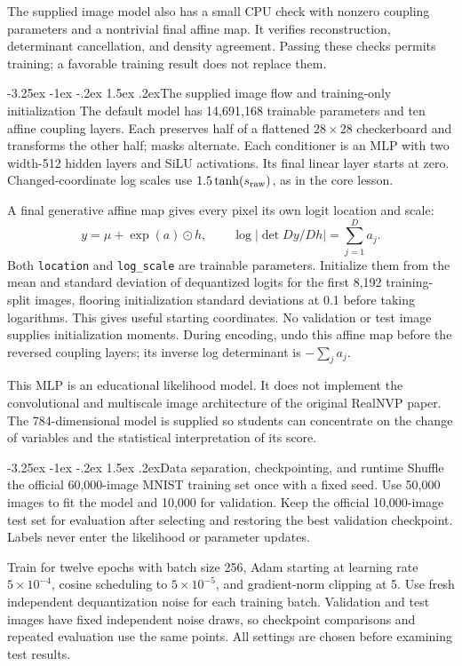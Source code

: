 \documentclass[11pt,a4paper]{article}
\makeatletter
\renewcommand\subsection{\@startsection{subsection}{2}{\z@}%
  {-3.25ex \@plus -1ex \@minus -.2ex}%
  {1.5ex \@plus .2ex}{\normalfont\large}}
\makeatother
\begin{document}
The supplied image model also has a small CPU check with nonzero coupling
parameters and a nontrivial final affine map. It verifies reconstruction,
determinant cancellation, and density agreement. Passing these checks permits
training; a favorable training result does not replace them.

\subsection{The supplied image flow and training-only initialization}
The default model has 14,691,168 trainable parameters and ten affine coupling
layers. Each preserves half of a
flattened $28\times28$ checkerboard and transforms the other half; masks
alternate. Each conditioner is an MLP with two width-512 hidden layers and
SiLU activations. Its final linear layer starts at zero. Changed-coordinate
log scales use $1.5\tanh(s_{\rm raw})$, as in the core lesson.

A final generative affine map gives every pixel its own logit location and
scale:
\[
 y=\mu+\exp(a)\odot h,\qquad
 \log|\det Dy/Dh|=\sum_{j=1}^D a_j.
\]
Both \texttt{location} and \texttt{log\_scale} are trainable parameters.
Initialize them from the mean and standard deviation of dequantized logits
for the first 8,192 training-split images, flooring initialization standard
deviations at 0.1 before taking logarithms. This gives useful starting
coordinates. No validation or test image supplies initialization moments.
During encoding, undo this affine map before the reversed coupling layers;
its inverse log determinant is $-\sum_j a_j$.

This MLP is an educational likelihood model. It does not implement the
convolutional and multiscale image architecture of the original RealNVP paper.
The 784-dimensional model is supplied so students can concentrate on the
change of variables and the statistical interpretation of its score.

\subsection{Data separation, checkpointing, and runtime}
Shuffle the official 60,000-image MNIST training set once with a fixed seed.
Use 50,000 images to fit the model and 10,000 for validation. Keep the official
10,000-image test set for evaluation after selecting and restoring the best
validation checkpoint. Labels never enter the likelihood or parameter updates.

Train for twelve epochs with batch size 256, Adam starting at learning rate
$5\times10^{-4}$, cosine scheduling to $5\times10^{-5}$, and gradient-norm
clipping at 5. Use fresh independent dequantization noise for each training
batch. Validation and test images have fixed independent noise draws, so
checkpoint comparisons and repeated evaluation use the same points. All
settings are chosen before examining test results.
\end{document}
